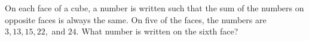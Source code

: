 On each face of a cube, a number is written such that the sum of the numbers on opposite faces is always the same. On five of the faces, the numbers are $3, 13, 15, 22,$ and $24$. What number is written on the sixth face?
